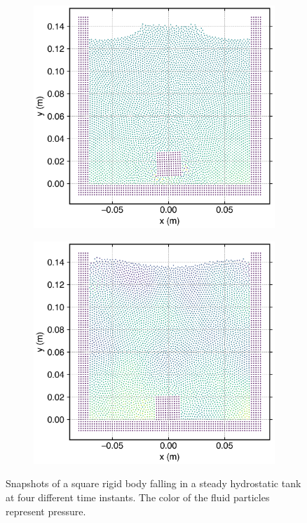 \begin{figure}[!htpb]
  \begin{subfigure}{0.48\textwidth}
    \centering
    \includegraphics[width=1.0\textwidth]{figures/rfc/figures/qiu_2017_falling_solid_in_water_2d/dx_0_002/time2}
  \end{subfigure}
  \begin{subfigure}{0.48\textwidth}
    \centering
    \includegraphics[width=1.0\textwidth]{figures/rfc/figures/qiu_2017_falling_solid_in_water_2d/dx_0_002/time4}
  \end{subfigure}
  \caption{Snapshots of a square rigid body falling in a steady hydrostatic tank
    at four different time instants. The color of the fluid particles represent
    pressure. }
\label{fig:snapshots-falling-solid-in-water}
\end{figure}
